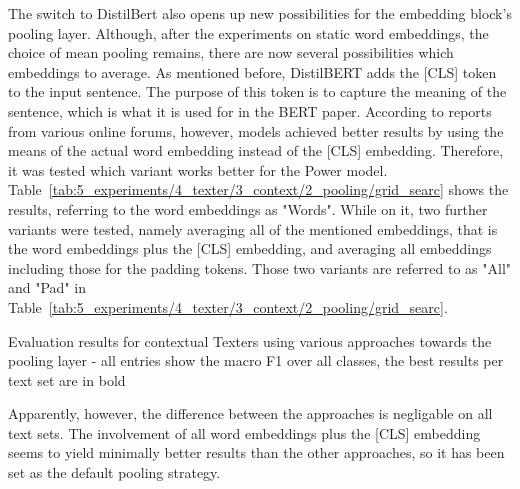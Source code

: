 The switch to DistilBert also opens up new possibilities for the embedding block's pooling layer. Although, after the experiments on static word embeddings, the choice of mean pooling remains, there are now several possibilities which embeddings to average. As mentioned before, DistilBERT adds the [CLS] token to the input sentence. The purpose of this token is to capture the meaning of the sentence, which is what it is used for in the BERT paper. According to reports from various online forums, however, models achieved better results by using the means of the actual word embedding instead of the [CLS] embedding. Therefore, it was tested which variant works better for the Power model. Table~\ref{tab:5_experiments/4_texter/3_context/2_pooling/grid_searc} shows the results, referring to the word embeddings as "Words". While on it, two further variants were tested, namely averaging all of the mentioned embeddings, that is the word embeddings plus the [CLS] embedding, and averaging all embeddings including those for the padding tokens. Those two variants are referred to as "All" and "Pad" in Table~\ref{tab:5_experiments/4_texter/3_context/2_pooling/grid_searc}.

\begin{table}[h]
    \centering
    
    \caption{Evaluation results for contextual Texters using various approaches towards the pooling layer - all entries show the macro F1 over all classes, the best results per text set are in bold}
    \label{tab:5_experiments/4_texter/3_context/2_pooling/grid_search}
\end{table}

Apparently, however, the difference between the approaches is negligable on all text sets. The involvement of all word embeddings plus the [CLS] embedding seems to yield minimally better results than the other approaches, so it has been set as the default pooling strategy.
